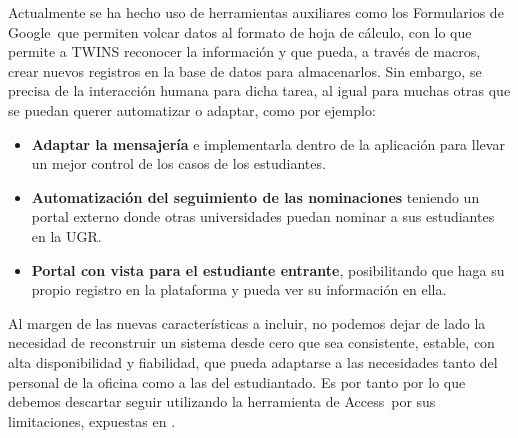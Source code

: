 Actualmente se ha hecho uso de herramientas auxiliares como los Formularios de Google\textregistered \ que permiten volcar datos al formato de hoja de cálculo, con lo que permite a TWINS reconocer la información y que pueda, a través de macros, crear nuevos registros en la base de datos para almacenarlos. Sin embargo, se precisa de la interacción humana para dicha tarea, al igual para muchas otras que se puedan querer automatizar o adaptar, como por ejemplo:

\begin{itemize}
	\item \textbf{Adaptar la mensajería} e implementarla dentro de la aplicación para llevar un mejor control de los casos de los estudiantes.
	\item \textbf{Automatización del seguimiento de las nominaciones} teniendo un portal externo donde otras universidades puedan nominar a sus estudiantes en la UGR.
	\item \textbf{Portal con vista para el estudiante entrante}, posibilitando que haga su propio registro en la plataforma y pueda ver su información en ella.
\end{itemize}

Al margen de las nuevas características a incluir, no podemos dejar de lado la necesidad de reconstruir un sistema desde cero que sea consistente, estable, con alta disponibilidad y fiabilidad, que pueda adaptarse a las necesidades tanto del personal de la oficina como a las del estudiantado. Es por tanto por lo que debemos descartar seguir utilizando la herramienta de Access\textregistered \ por sus limitaciones, expuestas en .